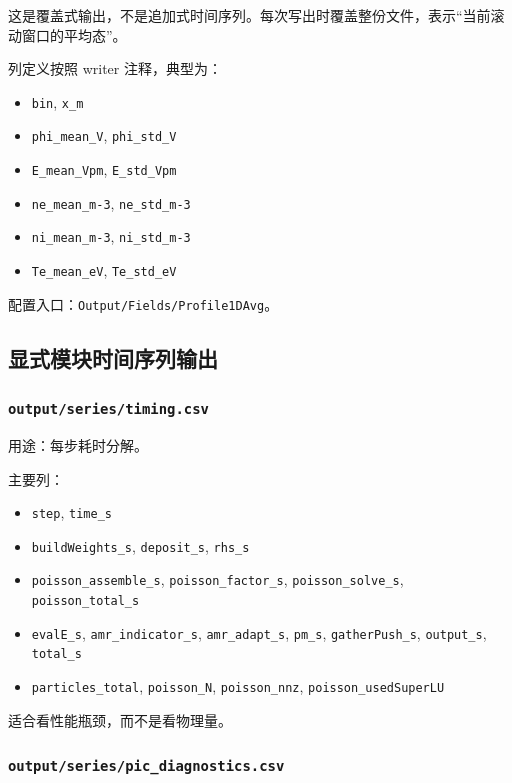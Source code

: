 \documentclass[11pt,a4paper]{ctexart}
\newcommand{\code}[1]{\texttt{#1}}
\newcommand{\file}[1]{\texttt{#1}}
\begin{document}
这是覆盖式输出，不是追加式时间序列。每次写出时覆盖整份文件，表示``当前滚动窗口的平均态''。

列定义按照 writer 注释，典型为：

\begin{itemize}
  \item \code{bin}, \code{x\_m}
  \item \code{phi\_mean\_V}, \code{phi\_std\_V}
  \item \code{E\_mean\_Vpm}, \code{E\_std\_Vpm}
  \item \code{ne\_mean\_m-3}, \code{ne\_std\_m-3}
  \item \code{ni\_mean\_m-3}, \code{ni\_std\_m-3}
  \item \code{Te\_mean\_eV}, \code{Te\_std\_eV}
\end{itemize}

配置入口：\code{Output/Fields/Profile1DAvg}。

\subsection{显式模块时间序列输出}

\subsubsection{\file{output/series/timing.csv}}

用途：每步耗时分解。

主要列：

\begin{itemize}
  \item \code{step}, \code{time\_s}
  \item \code{buildWeights\_s}, \code{deposit\_s}, \code{rhs\_s}
  \item \code{poisson\_assemble\_s}, \code{poisson\_factor\_s}, \code{poisson\_solve\_s}, \code{poisson\_total\_s}
  \item \code{evalE\_s}, \code{amr\_indicator\_s}, \code{amr\_adapt\_s}, \code{pm\_s}, \code{gatherPush\_s}, \code{output\_s}, \code{total\_s}
  \item \code{particles\_total}, \code{poisson\_N}, \code{poisson\_nnz}, \code{poisson\_usedSuperLU}
\end{itemize}

适合看性能瓶颈，而不是看物理量。

\subsubsection{\file{output/series/pic\_diagnostics.csv}}
\end{document}
